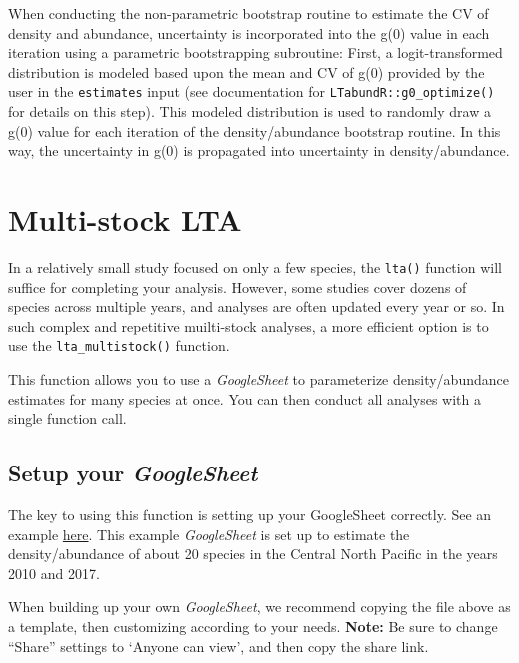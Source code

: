\documentclass[
]{book}
\begin{document}
When conducting the non-parametric bootstrap routine to estimate the CV of density and abundance, uncertainty is incorporated into the g(0) value in each iteration using a parametric bootstrapping subroutine: First, a logit-transformed distribution is modeled based upon the mean and CV of g(0) provided by the user in the \texttt{estimates} input (see documentation for \texttt{LTabundR::g0\_optimize()} for details on this step). This modeled distribution is used to randomly draw a g(0) value for each iteration of the density/abundance bootstrap routine. In this way, the uncertainty in g(0) is propagated into uncertainty in density/abundance.

\hypertarget{multistock}{%
\chapter{Multi-stock LTA}\label{multistock}}

In a relatively small study focused on only a few species, the \texttt{lta()} function
will suffice for completing your analysis. However, some studies cover dozens of species
across multiple years, and analyses are often updated every year or so. In such complex and repetitive muilti-stock analyses, a more efficient option is to use the \texttt{lta\_multistock()} function.

This function allows you to use a \emph{GoogleSheet} to parameterize density/abundance estimates for many species at once. You can then conduct all analyses with a single function call.

\hypertarget{setup-your-googlesheet}{%
\section*{\texorpdfstring{Setup your \emph{GoogleSheet}}{Setup your GoogleSheet}}\label{setup-your-googlesheet}}

The key to using this function is setting up your GoogleSheet correctly.
See an example \href{https://docs.google.com/spreadsheets/d/15uLleqIqoRKFRrnNttMcJx-Q_i7BfuepuUfOOjEP7Dw/edit?usp=sharing}{here}. This example \emph{GoogleSheet} is set up to estimate the density/abundance of about 20 species in the Central North Pacific in the years 2010 and 2017.

When building up your own \emph{GoogleSheet}, we recommend copying the file above as a template, then customizing according to your needs. \textbf{Note:} Be sure to change ``Share'' settings to `Anyone can view', and then copy the share link.
\end{document}
